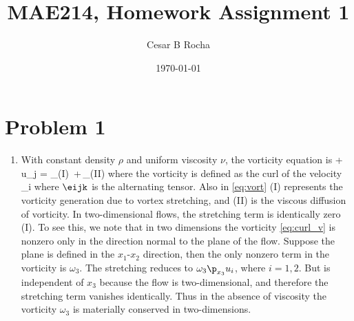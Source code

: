\documentclass[11pt]{article}
\title{MAE214, Homework Assignment 1}
\author{Cesar B Rocha}
\date{\today}
\begin{document}


\maketitle

\section*{Problem 1}

\begin{enumerate}[label=(\alph*)]

    \item With constant density $\rho$ and uniform viscosity $\nu$, the vorticity equation is
        \beq
            \label{eq:vort}
               + u_j  = _{(I)} \,+\,_{(II)}\com
        \eeq
        where the vorticity is defined as the curl of the velocity
        \beq
            \label{eq:curl_v}
            \omega_i  \eijk {}\com
        \eeq
        where $\eijk$ is the alternating tensor. Also in \eqref{eq:vort} (I) represents the vorticity generation due to vortex stretching, and (II) is the viscous diffusion of vorticity. In two-dimensional flows, the stretching term is identically zero (I).  To see this, we note that in two dimensions the vorticity \eqref{eq:curl_v} is nonzero only in the direction normal to the plane of the flow. Suppose the plane is defined in the $x_1$-$x_2$ direction, then the only nonzero term in the vorticity is $\omega_3$. The stretching reduces to $\omega_3 \p_{x_3}u_i$, where $i=1,2$. But is independent of $x_3$ because the flow is two-dimensional, and therefore the stretching term vanishes identically. Thus in the absence of  viscosity the vorticity $\omega_3$ is materially conserved in two-dimensions. 


\end{enumerate}
\end{document}
